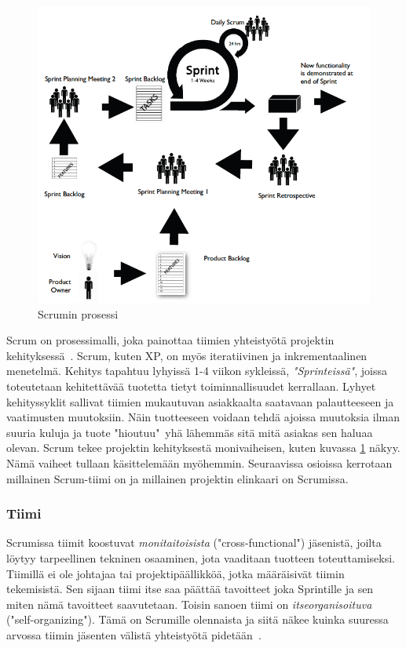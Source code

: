 \documentclass[finnish]{../tktltiki2}
\theoremstyle{definition}
\theoremstyle{remark}
\begin{document}
\begin{figure}[ht]
     \includegraphics{scrum.png}
     \caption{Scrumin prosessi~\cite{Scrumprimer}}\label{scrumprocess}
\end{figure}

Scrum on prosessimalli, joka painottaa tiimien yhteistyötä projektin 
kehityksessä~\cite{ScrumORG}. Scrum, kuten XP, on myös iteratiivinen 
ja inkrementaalinen menetelmä.
Kehitys tapahtuu lyhyissä 1-4 viikon sykleissä, 
\emph{"Sprinteissä"}, joissa toteutetaan kehitettävää tuotetta tietyt 
toiminnallisuudet kerrallaan. Lyhyet kehityssyklit sallivat tiimien 
mukautuvan asiakkaalta saatavaan palautteeseen ja vaatimusten 
muutoksiin. Näin tuotteeseen voidaan tehdä ajoissa
muutoksia ilman suuria kuluja ja tuote "hioutuu"~yhä lähemmäs sitä 
mitä asiakas sen haluaa olevan. Scrum tekee projektin kehityksestä
monivaiheisen, kuten kuvassa \ref{scrumprocess} näkyy. Nämä vaiheet tullaan käsittelemään myöhemmin. Seuraavissa osioissa kerrotaan millainen Scrum-tiimi
on ja millainen projektin elinkaari on Scrumissa.

\subsubsection{Tiimi}

Scrumissa tiimit koostuvat \emph{monitaitoisista} ("cross-functional") 
jäsenistä, joilta löytyy tarpeellinen tekninen osaaminen, jota 
vaaditaan
tuotteen toteuttamiseksi. Tiimillä ei ole johtajaa tai 
projektipäällikköä, jotka määräisivät tiimin tekemisistä. Sen sijaan 
tiimi itse
saa päättää tavoitteet joka Sprintille ja sen miten nämä tavoitteet 
saavutetaan. Toisin sanoen tiimi on \emph{itseorganisoituva}
("self-organizing"). Tämä on Scrumille olennaista ja siitä näkee 
kuinka suuressa arvossa tiimin jäsenten välistä yhteistyötä 
pidetään~\cite{ScrumHandBook}.
\end{document}
